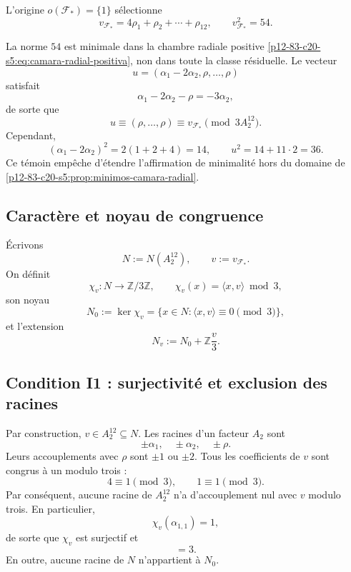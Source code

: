 L'origine \(o(\mathcal F_*)=\{1\}\) sélectionne
\begin{equation}
 \boxed{
 v_{\mathcal F_*}
 =4\rho_1+\rho_2+\cdots+\rho_{12},
 \qquad
 v_{\mathcal F_*}^2=54.}
 \label{p12-83-c20-s5:eq:vector-marco-incidencial}
\end{equation}

\begin{remark}
La norme \(54\) est minimale dans la chambre radiale positive
\eqref{p12-83-c20-s5:eq:camara-radial-positiva}, non dans toute la classe résiduelle. Le vecteur
\[
 u=(\alpha_1-2\alpha_2,\rho,\ldots,\rho)
\]
satisfait
\[
 \alpha_1-2\alpha_2-\rho=-3\alpha_2,
\]
de sorte que
\[
 u\equiv(\rho,\ldots,\rho)
 \equiv v_{\mathcal F_*}\pmod{3A_2^{12}}.
\]
Cependant,
\[
 (\alpha_1-2\alpha_2)^2
 =2(1+2+4)=14,
 \qquad
 u^2=14+11\cdot2=36.
\]
Ce témoin empêche d'étendre l'affirmation de minimalité hors du domaine
de \cref{p12-83-c20-s5:prop:minimos-camara-radial}.
\end{remark}

\subsection{Caractère et noyau de congruence}

Écrivons
\[
 N:=N(A_2^{12}),
 \qquad
 v:=v_{\mathcal F_*}.
\]
On définit
\begin{equation}
 \chi_v:N\longrightarrow\mathbb Z/3\mathbb Z,
 \qquad
 \chi_v(x)=\langle x,v\rangle\bmod3,
 \label{p12-83-c20-s5:eq:caracter-vecino-leech}
\end{equation}
son noyau
\begin{equation}
 N_0:=\ker\chi_v
 =\{x\in N:\langle x,v\rangle\equiv0\pmod3\},
 \label{p12-83-c20-s5:eq:nucleo-congruencia-vecino}
\end{equation}
et l'extension
\begin{equation}
 N_v:=N_0+\mathbb Z\frac v3.
 \label{p12-83-c20-s5:eq:definicion-vecino-indice-tres}
\end{equation}

\subsection{Condition I1 : surjectivité et exclusion des racines}

Par construction, \(v\in A_2^{12}\subseteq N\). Les racines d'un facteur
\(A_2\) sont
\[
 \pm\alpha_1,
 \quad
 \pm\alpha_2,
 \quad
 \pm\rho.
\]
Leurs accouplements avec \(\rho\) sont \(\pm1\) ou \(\pm2\). Tous les
coefficients de \(v\) sont congrus à un modulo trois :
\[
 4\equiv1\pmod3,
 \qquad
 1\equiv1\pmod3.
\]
Par conséquent, aucune racine de \(A_2^{12}\) n'a d'accouplement nul avec
\(v\) modulo trois. En particulier,
\[
 \chi_v(\alpha_{1,1})=1,
\]
de sorte que \(\chi_v\) est surjectif et
\begin{equation}
 [N:N_0]=3.
 \label{p12-83-c20-s5:eq:indice-nucleo-vecino}
\end{equation}
En outre, aucune racine de \(N\) n'appartient à \(N_0\).

